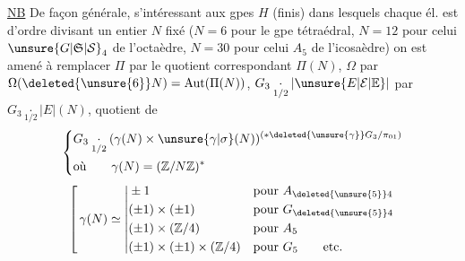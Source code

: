 \uline{NB} De façon générale, s'intéressant aux gpes $H$ (finis) dans lesquels chaque él. est d'ordre  divisant un entier $N$ fixé ($N=6$ pour le gpe tétraédral, $N=12$ pour celui ${\unsure{G|\mathfrak S|\mathcal S}}_4$ de l'octaèdre, $N=30$ pour celui $A_5$ de l'icosaèdre) on est amené à remplacer $\Pi$ par le quotient correspondant $\Pi(N)$, $\Omega$ par $\Omega(\deleted{\unsure{6}}N)=\mathrm{Aut}(\Pi(N))$,  $G_3\underset{1/2}{\cdot}|\unsure{E|\mathcal E|\mathbb E}|$ par $G_3\underset{1/2}{\cdot}|E|(N)$, quotient de 
\[
\left\{\begin{aligned}
&G_3\underset{1/2}{\cdot}(\gamma(N)\times\unsure{\gamma|\sigma}(N))^{(*\deleted{\unsure{\gamma}}G_3/\pi_{01})}\\
&\text{où}\qquad\gamma(N)=(\mathbb Z/N\mathbb Z)^*
\end{aligned}\right.
\]
\[
\left[\,\gamma(N)\simeq
\left|\begin{aligned}
&\pm1 &&\text{pour }A_{\deleted{\unsure{5}}4}\\
&(\pm1)\times(\pm1)&&\text{pour }G_{\deleted{\unsure{5}}4}\\
&(\pm1)\times(\mathbb Z/4)&&\text{pour }A_5\\
&(\pm1)\times(\pm1)\times(\mathbb Z/4)&&\text{pour }G_5\qquad\text{etc.}
\end{aligned}\right.\right.
\]
